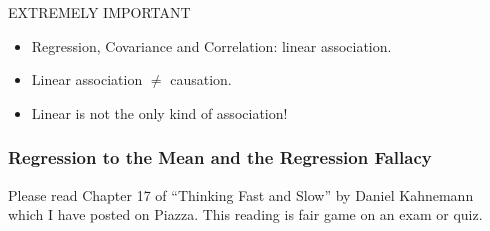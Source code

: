 \documentclass{beamer}
\begin{document}
\begin{frame}

\begin{alertblock}{EXTREMELY IMPORTANT}
	\begin{itemize}
		\item Regression, Covariance and Correlation: linear association.
		\item Linear association $\neq$ causation. 
		\item Linear is not the only kind of association!
	\end{itemize}
\end{alertblock}


\end{frame}

\begin{frame}
  \frametitle{Regression to the Mean and the Regression Fallacy}

  \alert{Please read Chapter 17 of ``Thinking Fast and Slow'' by Daniel Kahnemann which I have posted on Piazza. This reading is fair game on an exam or quiz.}
\end{frame}
\begin{frame}



\end{frame}

%
\end{document}
